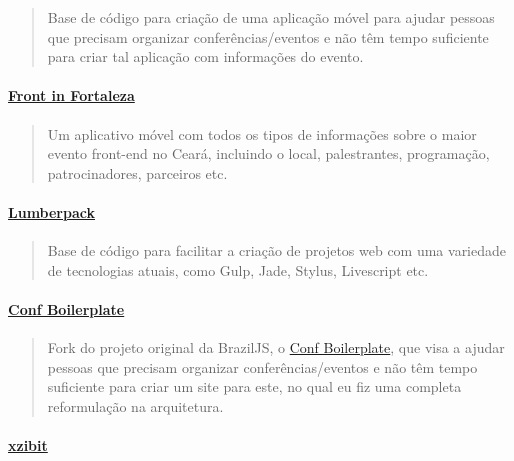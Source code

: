 \documentclass[]{article}
\let\oldparagraph\paragraph
\renewcommand{\paragraph}[1]{\oldparagraph{#1}\mbox{}}
\begin{document}
\begin{quote}
Base de código para criação de uma aplicação móvel para ajudar pessoas
que precisam organizar conferências/eventos e não têm tempo suficiente
para criar tal aplicação com informações do evento.
\end{quote}

\paragraph{\texorpdfstring{\href{https://play.google.com/store/apps/details?id=com.devevents.frontinfortaleza}{Front
in Fortaleza}}{Front in Fortaleza}}\label{front-in-fortaleza}

\begin{quote}
Um aplicativo móvel com todos os tipos de informações sobre o maior
evento front-end no Ceará, incluindo o local, palestrantes, programação,
patrocinadores, parceiros etc.
\end{quote}

\paragraph{\texorpdfstring{\href{https://github.com/mabrasil/lumberpack}{Lumberpack}}{Lumberpack}}\label{lumberpack}

\begin{quote}
Base de código para facilitar a criação de projetos web com uma
variedade de tecnologias atuais, como Gulp, Jade, Stylus, Livescript
etc.
\end{quote}

\paragraph{\texorpdfstring{\href{https://github.com/mabrasil/conf-boilerplate}{Conf
Boilerplate}}{Conf Boilerplate}}\label{conf-boilerplate}

\begin{quote}
Fork do projeto original da BrazilJS, o
\href{https://github.com/braziljs/conf-boilerplate}{Conf Boilerplate},
que visa a ajudar pessoas que precisam organizar conferências/eventos e
não têm tempo suficiente para criar um site para este, no qual eu fiz
uma completa reformulação na arquitetura.
\end{quote}

\paragraph{\texorpdfstring{\href{https://github.com/mabrasil/xzibit}{xzibit}}{xzibit}}\label{xzibit}
\end{document}
